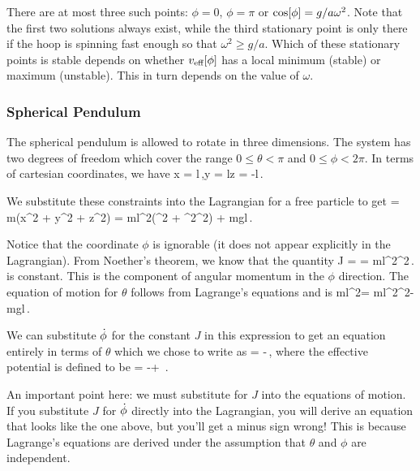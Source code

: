 There are at most three such points: $\phi = 0$, $\phi = \pi$ or $\cos\!\left[{\phi}\right] = g/a\omega^2$. Note that the first two solutions always exist, while the third stationary point is only there if the hoop is spinning fast enough so that $\omega^2\geq g/a$. Which of these stationary points is stable depends on whether $v_\text{eff}\!\left[{\phi}\right]$ has a local minimum (stable) or maximum (unstable). This in turn depends on the value of $\omega$.


\subsubsection{Spherical Pendulum}
The spherical pendulum is allowed to rotate in three dimensions. The system has two degrees of freedom which cover the range $0\leq\theta < \pi$ and $0\leq\phi < 2\pi$. In terms of cartesian coordinates, we have
\beq
x = l\cos\vat\phi\sin\vat\theta\,,\quad y = l\sin\vat\phi\sin\vat\theta\quad{}\quad z = -l\cos\vat\theta\,.
\eeq

We substitute these constraints into the Lagrangian for a free particle to get
\beq
\lag = m\left(\dt x^2 + \dt y^2 + \dt z^2\right) 
     = ml^2\left(\dt\theta^2 + \dt\phi^2\sin^2\vat\theta\right) + mgl\cos\vat\theta\,.
\eeq

Notice that the coordinate $\phi$ is ignorable (it does not appear explicitly in the Lagrangian). From Noether's theorem, we know that the quantity
\beq
J = \xpd{\lag}{\dt\phi} = ml^2\dt\phi\sin^2\vat\theta\,.
\eeq
is constant. This is the component of angular momentum in the $\phi$ direction. The equation of motion for $\theta$ follows from Lagrange's equations and is
\beq
ml^2\ddt\theta = ml^2\dt\phi^2\sin\vat\theta\cos\vat\theta - mgl\sin\vat\theta\,.
\eeq

We can substitute $\dot{\phi}$ for the constant $J$ in this expression to get an equation entirely in terms of $\theta$ which we chose to write as
\beq
\ddt\theta = -\,,
\eeq
where the effective potential is defined to be 
\beq
\pen{} = -\cos\vat\theta + \,.
\eeq

An important point here: we must substitute for $J$ into the equations of motion. If you substitute $J$ for $\dot{\phi}$ directly into the Lagrangian, you will derive an equation that looks like the one above, but you'll get a minus sign wrong! This is because Lagrange's equations are derived under the assumption that $\theta$ and $\phi$ are independent.

